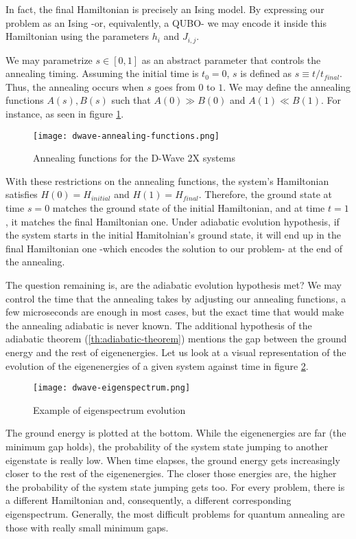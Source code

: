 In fact, the final Hamiltonian is precisely an Ising model. By expressing our problem as an Ising -or, equivalently, a QUBO- we may encode it inside this Hamiltonian using the parameters $h_i$ and $J_{i,j}$.

We may parametrize $s \in [0,1]$ as an abstract parameter that controls the annealing timing. Assuming the initial time is $t_0 = 0$, $s$ is defined as $s \equiv t / t_{final}$. Thus, the annealing occurs when $s$ goes from $0$ to $1$. We may define the annealing functions $A(s), B(s)$ such that $A(0) \gg B(0)$ and $A(1) \ll B(1)$. For instance, as seen in figure \ref{fig:dwave-annealing-functions}.

\begin{figure}[h]
	\texttt{[image: dwave-annealing-functions.png]}
	\centering
	\caption{Annealing functions for the D-Wave 2X systems \cite{DWaveDoc-QuantumAnnealing}}
	\label{fig:dwave-annealing-functions}
\end{figure}

With these restrictions on the annealing functions, the system's Hamiltonian satisfies $H(0) = H_{initial}$ and $H(1) = H_{final}$. Therefore, the ground state at time $s=0$ matches the ground state of the initial Hamiltonian, and at time $t=1$, it matches the final Hamiltonian one. Under adiabatic evolution hypothesis, if the system starts in the initial Hamitolnian's ground state, it will end up in the final Hamiltonian one -which encodes the solution to our problem- at the end of the annealing.

The question remaining is, are the adiabatic evolution hypothesis met? We may control the time that the annealing takes by adjusting our annealing functions, a few microseconds are enough in most cases, but the exact time that would make the annealing adiabatic is never known. The additional hypothesis of the adiabatic theorem (\ref{th:adiabatic-theorem}) mentions the gap between the ground energy and the rest of eigenenergies. Let us look at a visual representation of the evolution of the eigenenergies of a given system against time in figure \ref{fig:dwave-eigenspectrum}.

\begin{figure}[h]
	\texttt{[image: dwave-eigenspectrum.png]}
	\centering
	\caption{Example of eigenspectrum evolution \cite{DWaveDoc-QuantumAnnealing}}
	\label{fig:dwave-eigenspectrum}
\end{figure}

The ground energy is plotted at the bottom. While the eigenenergies are far (the minimum gap holds), the probability of the system state jumping to another eigenstate is really low. When time elapses, the ground energy gets increasingly closer to the rest of the eigenenergies. The closer those energies are, the higher the probability of the system state jumping gets too. For every problem, there is a different Hamiltonian and, consequently, a different corresponding eigenspectrum. Generally, the most difficult problems for quantum annealing are those with really small minimum gaps.

